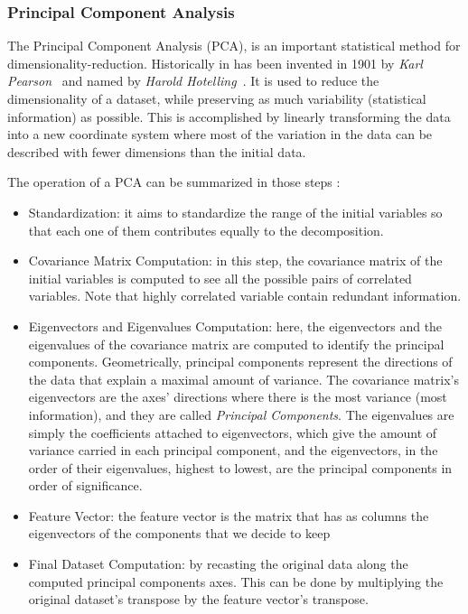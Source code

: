 \subsubsection{Principal Component Analysis}\label{IPCA}
The Principal Component Analysis (PCA), is an important statistical method for dimensionality-reduction. 
Historically in has been invented in 1901 by \textit{Karl Pearson}~\cite{pearson_karl_1901_1430636} and named by \textit{Harold Hotelling}~\cite{10.2307/2333955}.
It is used to reduce the  dimensionality of a dataset, while preserving as much variability (statistical information) as possible\cite{jolliffe2016principal}. 
This is accomplished by linearly transforming the data into a new coordinate system where most of the variation in the data can be described with fewer dimensions than the initial data.

The operation of a PCA can be summarized in those steps \cite{noauthor_principal_nodate, ho_principal_nodate, noauthor_beginners_nodate}: 
\begin{itemize}
    \item Standardization: it aims to standardize the range of the initial variables so that each one of them contributes equally to the decomposition.
    
    \item Covariance Matrix Computation: in this step, the covariance matrix of the initial variables is computed to see all the possible pairs of correlated variables. Note that highly correlated variable contain redundant information.
    
    \item Eigenvectors and Eigenvalues Computation: here, the eigenvectors and the eigenvalues of the covariance matrix are computed to identify the principal components. Geometrically, principal components represent the directions of the data that explain a maximal amount of variance. The covariance matrix's eigenvectors are the axes' directions where there is the most variance (most information), and they are called \textit{Principal Components}. The eigenvalues are simply the coefficients attached to eigenvectors, which give the amount of variance carried in each principal component, and the eigenvectors, in the order of their eigenvalues, highest to lowest, are the principal components in order of significance.
    
    \item Feature Vector: the feature vector is the matrix that has as columns the eigenvectors of the components that we decide to keep

    \item Final Dataset Computation: by recasting the original data along the computed principal components axes. This can be done by multiplying the original dataset's transpose by the feature vector's transpose.
    
\end{itemize}

